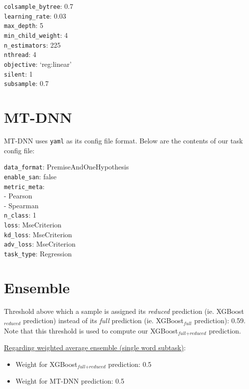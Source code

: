 \documentclass{dcthesis}
\theoremstyle{definition}
\theoremstyle{remark}
\begin{document}
\indent \texttt{colsample\_bytree}: 0.7\\
\indent \texttt{learning\_rate}: 0.03\\
\indent \texttt{max\_depth}: 5\\
\indent \texttt{min\_child\_weight}: 4\\
\indent \texttt{n\_estimators}: 225\\
\indent \texttt{nthread}: 4\\
\indent \texttt{objective}: `reg:linear'\\
\indent \texttt{silent}: 1\\
\indent \texttt{subsample}: 0.7

\section{MT-DNN}

MT-DNN uses \texttt{yaml} as its config file format. Below are the contents of our task config file:

\indent \texttt{data\_format}: PremiseAndOneHypothesis\\
\indent \texttt{enable\_san}: false\\
\indent \texttt{metric\_meta}:\\
\indent - Pearson\\
\indent - Spearman\\
\indent \texttt{n\_class}: 1\\
\indent \texttt{loss}: MseCriterion\\
\indent \texttt{kd\_loss}: MseCriterion\\
\indent \texttt{adv\_loss}: MseCriterion\\
\indent \texttt{task\_type}: Regression

\section{Ensemble}

Threshold above which a sample is assigned its \textit{reduced} prediction (ie. XGBoost$_\textit{reduced}$ prediction) instead of its \textit{full} prediction (ie. XGBoost$_\textit{full}$ prediction): 0.59. Note that this threshold is used to compute our XGBoost$
_{\textit{full}+\textit{reduced}}$ prediction.

\noindent \underline{Regarding weighted average ensemble (single word subtask)}:
\begin{itemize}
  \item Weight for XGBoost$_{\textit{full}+\textit{reduced}}$ prediction: 0.5
  \item Weight for MT-DNN prediction: 0.5
\end{itemize}
\end{document}
